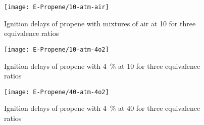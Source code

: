\documentclass[../main.tex]{subfiles}
\begin{document}
\begin{figure}
    \begin{floatrow}
        \ffigbox
            {\texttt{[image: E-Propene/10-atm-air]}}
            {\caption{Ignition delays of propene with mixtures of air at
            \SI{10}{\atmosphere} for three equivalence ratios}
            \label{fig:10-atm-air}}
    \end{floatrow}
\end{figure}

\begin{figure}
    \begin{floatrow}
        \ffigbox
            {\texttt{[image: E-Propene/10-atm-4o2]}}
            {\caption[Ignition delays of propene with \SI{4}{\percent}
             at \SI{10}{\atmosphere} for three\newline equivalence ratios]{Ignition delays of propene with \SI{4}{\percent}
             at \SI{10}{\atmosphere} for three equivalence ratios}
            \label{fig:10-atm-4o2}}
        \ffigbox
            {\texttt{[image: E-Propene/40-atm-4o2]}}
            {\caption[Ignition delays of propene with \SI{4}{\percent}
             at \SI{40}{\atmosphere} for three\newline equivalence ratios]{Ignition delays of propene with \SI{4}{\percent}
             at \SI{40}{\atmosphere} for three equivalence ratios}
            \label{fig:40-atm-4o2}}
    \end{floatrow}
\end{figure}
\end{document}
